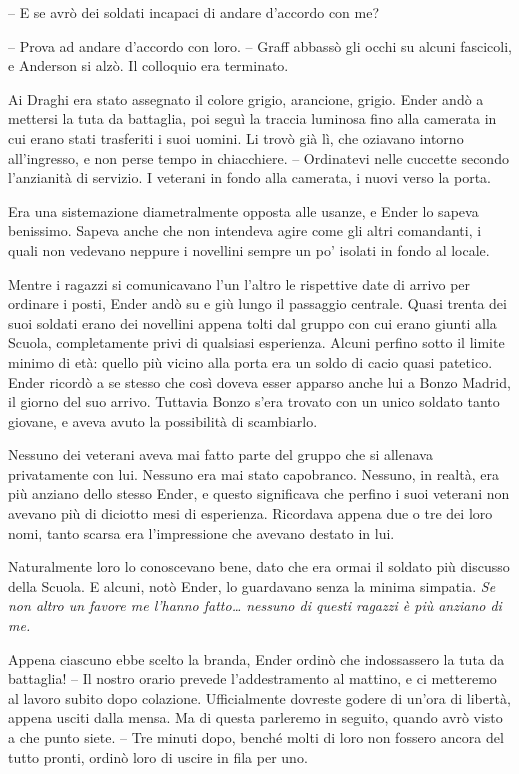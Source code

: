 {-- E se avrò dei soldati incapaci di andare d'accordo con me?}

{-- Prova ad andare d'accordo con loro. -- Graff abbassò gli occhi su
	alcuni fascicoli, e Anderson si alzò. Il colloquio era terminato.}

{Ai Draghi era stato assegnato il colore grigio, arancione, grigio.
	Ender andò a mettersi la tuta da battaglia, poi seguì la traccia
	luminosa fino alla camerata in cui erano stati trasferiti i suoi uomini.
	Li trovò già lì, che oziavano intorno all'ingresso, e non perse tempo in
	chiacchiere. -- Ordinatevi nelle cuccette secondo l'anzianità di
	servizio. I veterani in fondo alla camerata, i nuovi verso la porta.}

{Era una sistemazione diametralmente opposta alle usanze, e Ender lo
	sapeva benissimo. Sapeva anche che non intendeva agire come gli altri
	comandanti, i quali non vedevano neppure i novellini sempre un po'
	isolati in fondo al locale.}

{Mentre i ragazzi si comunicavano l'un l'altro le rispettive date di
	arrivo per ordinare i posti, Ender andò su e giù lungo il passaggio
	centrale. Quasi trenta dei suoi soldati erano dei novellini appena tolti
	dal gruppo con cui erano giunti alla Scuola, completamente privi di
	qualsiasi esperienza. Alcuni perfino sotto il limite minimo di età:
	quello più vicino alla porta era un soldo di cacio quasi patetico. Ender
	ricordò a se stesso che così doveva esser apparso anche lui a Bonzo
	Madrid, il giorno del suo arrivo. Tuttavia Bonzo s'era trovato con un
	unico soldato tanto giovane, e aveva avuto la possibilità di
	scambiarlo.}

{Nessuno dei veterani aveva mai fatto parte del gruppo che si allenava
	privatamente con lui. Nessuno era mai stato capobranco. Nessuno, in
	realtà, era più anziano dello stesso Ender, e questo significava che
	perfino i suoi veterani non avevano più di diciotto mesi di esperienza.
	Ricordava appena due o tre dei loro nomi, tanto scarsa era l'impressione
	che avevano destato in lui.}

{Naturalmente loro lo conoscevano bene, dato che era ormai il soldato
	più discusso della Scuola. E alcuni, notò Ender, lo guardavano senza la
	minima simpatia. \emph{Se non altro un favore me l'hanno fatto\ldots{}
		nessuno di questi ragazzi è più anziano di me.}}

{Appena ciascuno ebbe scelto la branda, Ender ordinò che indossassero la
	tuta da battaglia! -- Il nostro orario prevede l'addestramento al
	mattino, e ci metteremo al lavoro subito dopo colazione. Ufficialmente
	dovreste godere di un'ora di libertà, appena usciti dalla mensa. Ma di
	questa parleremo in seguito, quando avrò visto a che punto siete. -- Tre
	minuti dopo, benché molti di loro non fossero ancora del tutto pronti,
	ordinò loro di uscire in fila per uno.}

